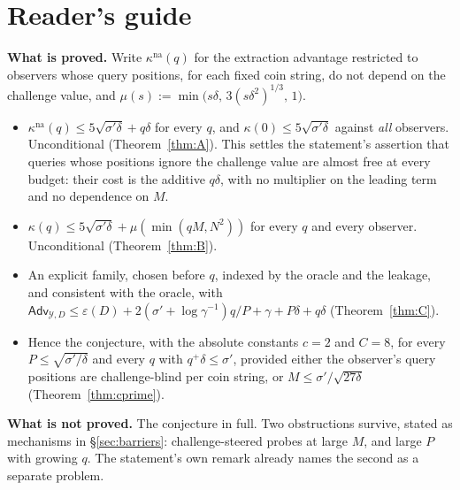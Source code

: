 \documentclass{aicr-solution}
\newcommand{\Adv}{\mathsf{Adv}}
\newcommand{\kna}{\kappa^{\mathrm{na}}}
\begin{document}

\vspace{0.4em}

\section*{Reader's guide}

\noindent\textbf{What is proved.} Write $\kna(q)$ for the extraction advantage
restricted to observers whose query positions, for each fixed coin string, do not
depend on the challenge value, and $\mu(s):=\min\bigl(s\delta,\,3(s\delta^{2})^{1/3},\,1\bigr)$.

\begin{itemize}
\item[(A)] $\kna(q)\le 5\sqrt{\sigma'\delta}+q\delta$ for every $q$, and
  $\kappa(0)\le5\sqrt{\sigma'\delta}$ against \emph{all} observers.
  Unconditional (Theorem~\ref{thm:A}). This settles the statement's assertion that queries whose
  positions ignore the challenge value are almost free at every budget: their
  cost is the additive $q\delta$, with no multiplier on the leading term and no
  dependence on $M$.
\item[(B)] $\kappa(q)\le 5\sqrt{\sigma'\delta}+\mu(\min(qM,N^{2}))$ for every $q$
  and every observer. Unconditional (Theorem~\ref{thm:B}).
\item[(C)] An explicit family, chosen before $q$, indexed by the oracle and the
  leakage, and consistent with the oracle, with
  $\Adv_{\mathcal Y,D}\le\varepsilon(D)+2(\sigma'+\log\gamma^{-1})q/P+\gamma+P\delta+q\delta$ (Theorem~\ref{thm:C}).
\item[(C$'$)] Hence the conjecture, with the absolute constants $c=2$ and $C=8$, for
  every $P\le\sqrt{\sigma'/\delta}$ and every $q$ with $q^{+}\delta\le\sigma'$,
  provided either the observer's query positions are challenge-blind per coin
  string, or $M\le\sigma'/\sqrt{27\delta}$ (Theorem~\ref{thm:cprime}).
\end{itemize}

\noindent\textbf{What is not proved.} The conjecture in full. Two obstructions
survive, stated as mechanisms in \S\ref{sec:barriers}: challenge-steered probes
at large $M$, and large $P$ with growing $q$. The statement's own remark already
names the second as a separate problem.
\end{document}
